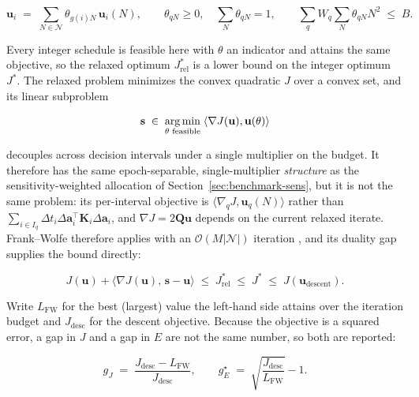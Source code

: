 \begin{equation}
  \mathbf u_i \;=\; \sum_{N\in\mathcal{N}}\theta_{g(i)N}\,\mathbf u_i(N),
  \qquad
  \theta_{qN}\ge0, \quad \sum_N \theta_{qN}=1,
  \qquad
  \sum_q W_q \sum_N \theta_{qN}N^2 \;\le\; B .
  \label{eq:relaxation}
\end{equation}

Every integer schedule is feasible here with $\theta$ an indicator and attains
the same objective, so the relaxed optimum $J^{*}_{\mathrm{rel}}$ is a lower
bound on the integer optimum $J^{*}$. The relaxed problem minimizes the convex
quadratic $J$ over a convex set, and its linear subproblem

\begin{equation}
  \mathbf s \;\in\; \operatorname*{arg\,min}_{\theta \text{ feasible}}\;
  \langle \nabla J(\mathbf u), \mathbf u(\theta)\rangle
  \label{eq:fw-subproblem}
\end{equation}

decouples across decision intervals under a single multiplier on the budget. It
therefore has the same epoch-separable, single-multiplier \emph{structure} as
the sensitivity-weighted allocation of Section~\ref{sec:benchmark-sens}, but it
is not the same problem: its per-interval objective is
$\langle\nabla_q J,\mathbf u_q(N)\rangle$ rather than
$\sum_{i\in I_q}\Delta t_i\Delta\mathbf a_i^{\top}\mathbf K_i\Delta\mathbf a_i$,
and
$\nabla J = 2\mathbf Q\mathbf u$ depends on the current relaxed iterate.
Frank--Wolfe therefore applies with an
$\mathcal{O}(M\lvert\mathcal{N}\rvert)$ iteration
\citep{frank1956algorithm,jaggi2013revisiting}, and its duality gap supplies
the bound directly:

\begin{equation}
  J(\mathbf u) + \langle\nabla J(\mathbf u),\,\mathbf s-\mathbf u\rangle
  \;\le\; J^{*}_{\mathrm{rel}} \;\le\; J^{*}
  \;\le\; J(\mathbf u_{\mathrm{descent}}) .
  \label{eq:certificate}
\end{equation}

Write $L_{\mathrm{FW}}$ for the best (largest) value the left-hand side attains
over the iteration budget and $J_{\mathrm{desc}}$ for the descent objective.
Because the objective is a squared error, a gap in $J$ and a gap in $E$ are not
the same number, so both are reported:

\begin{equation}
  g_J \;=\; \frac{J_{\mathrm{desc}}-L_{\mathrm{FW}}}{J_{\mathrm{desc}}},
  \qquad
  g_E^{\star} \;=\; \sqrt{\frac{J_{\mathrm{desc}}}{L_{\mathrm{FW}}}}-1 .
  \label{eq:certified-gap}
\end{equation}

